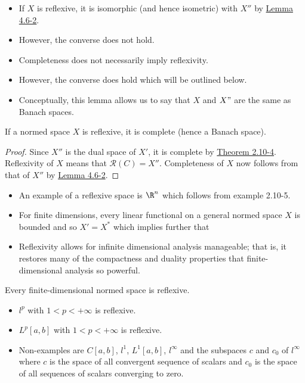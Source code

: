 \begin{itemize}
    \item If \( X  \) is reflexive, it is isomorphic (and hence isometric) with \( X'' \) by {\hyperref[Canonical Mapping Lemma]{Lemma 4.6-2}}.  
    \item However, the converse does not hold.
    \item Completeness does not necessarily imply reflexivity.
    \item However, the converse does hold which will be outlined below.
    \item Conceptually, this lemma allows us to say that \( X  \) and \( X" \) are the same as Banach spaces.
\end{itemize}

\begin{theorem}[Completeness]
    If a normed space \( X  \) is reflexive, it is complete (hence a Banach space).
\end{theorem}
\begin{proof}
    Since \( X'' \) is the dual space of \( X' \), it is complete by {\hyperref[2.10-4]{Theorem 2.10-4}}. Reflexivity of \( X  \) means that \( \mathcal{R}(C) = X''\). Completeness of \( X  \) now follows from that of \( X'' \) by {\hyperref[Canonical Mapping Lemma]{Lemma 4.6-2}}.  
\end{proof}

\begin{itemize}
    \item An example of a reflexive space is \( \R^{n} \) which follows from example 2.10-5.
    \item For finite dimensions, every linear functional on a general normed space \( X  \) is bounded and so \( X' = X^{*} \) which implies further that 
    \item Reflexivity allows for infinite dimensional analysis manageable; that is, it restores many of the compactness and duality properties that finite-dimensional analysis so powerful. 
\end{itemize}



\begin{theorem}
    Every finite-dimensional normed space is reflexive.
\end{theorem}

\begin{itemize}
    \item \( l^{p} \) with \( 1 < p < + \infty  \) is reflexive.
    \item \( L^{p}[a,b]  \) with \( 1 < p < + \infty  \) is reflexive.
    \item Non-examples are \( C[a,b] \), \( l^{1} \), \( L^{1}[a,b] \), \( l^{\infty } \) and the subspaces \( c  \) and \( {c}_{0}  \) of \( l^{\infty } \) where \( c  \) is the space of all convergent sequence of scalars and \( {c}_{0} \) is the space of all sequences of scalars converging to zero.
\end{itemize}

